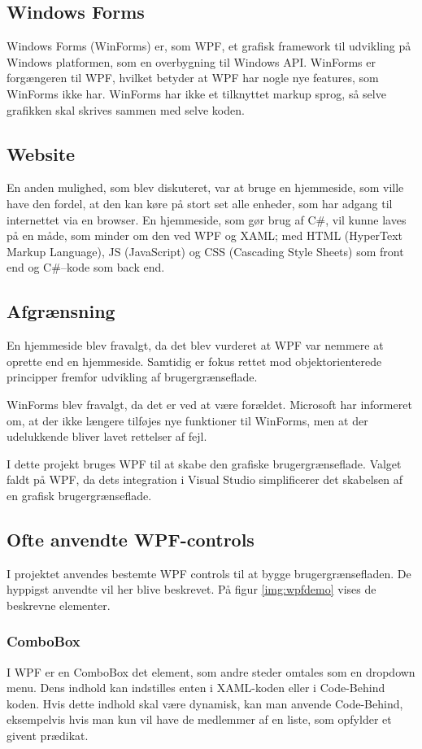 \subsection{Windows Forms}
Windows Forms (WinForms) er, som \ac{WPF}, et grafisk framework til udvikling på Windows platformen, som en overbygning til Windows API.
WinForms er forgængeren til WPF, hvilket betyder at WPF har nogle nye features, som WinForms ikke har.
WinForms har ikke et tilknyttet markup sprog, så selve grafikken skal skrives sammen med selve koden. 
\citep{winforms2}

\subsection{Website}
En anden mulighed, som blev diskuteret, var at bruge en hjemmeside, som ville have den fordel, at den kan køre på stort set alle enheder, som har adgang til internettet via en browser. 
En hjemmeside, som gør brug af C\#, vil kunne laves på en måde, som minder om den ved WPF og XAML; med HTML (HyperText Markup Language), JS (JavaScript) og CSS (Cascading Style Sheets) som front end og C\#--kode som back end. 

\subsection{Afgrænsning}
En hjemmeside blev fravalgt, da det blev vurderet at WPF var nemmere at oprette end en hjemmeside.
Samtidig er fokus rettet mod objektorienterede principper fremfor udvikling af brugergrænseflade.

WinForms blev fravalgt, da det er ved at være forældet.
Microsoft har informeret om, at der ikke længere tilføjes nye funktioner til WinForms, men at der udelukkende bliver lavet rettelser af fejl.\citep{winforms}

I dette projekt bruges \ac{WPF} til at skabe den grafiske brugergrænseflade. 
Valget faldt på \ac{WPF}, da dets integration i Visual Studio simplificerer det skabelsen af en grafisk brugergrænseflade.


\subsection{Ofte anvendte WPF-controls}
I projektet anvendes bestemte WPF controls til at bygge brugergrænsefladen. 
De hyppigst anvendte vil her blive beskrevet. 
På figur \ref{img:wpfdemo} vises de beskrevne elementer.

\subsubsection*{ComboBox}
I WPF er en ComboBox det element, som andre steder omtales som en dropdown menu. 
Dens indhold kan indstilles enten i XAML-koden eller i Code-Behind koden.
Hvis dette indhold skal være dynamisk, kan man anvende Code-Behind, eksempelvis hvis man kun vil have de medlemmer af en liste, som opfylder et givent prædikat.

